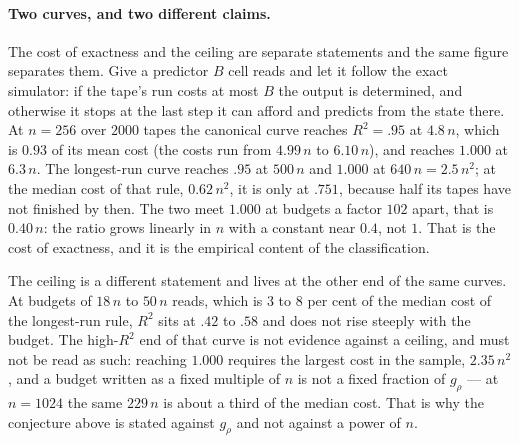 \documentclass[11pt]{article}
\begin{document}
\paragraph{Two curves, and two different claims.} The cost of exactness and the ceiling are separate
statements and the same figure separates them. Give a predictor $B$ cell reads and let it follow the
exact simulator: if the tape's run costs at most $B$ the output is determined, and otherwise it stops at
the last step it can afford and predicts from the state there. At $n=256$ over $2000$ tapes the
canonical curve reaches $R^2=.95$ at $4.8\,n$, which is $0.93$ of its mean cost (the costs run from
$4.99\,n$ to $6.10\,n$), and reaches $1.000$ at $6.3\,n$. The longest-run curve reaches $.95$ at
$500\,n$ and $1.000$ at $640\,n=2.5\,n^2$; at the median cost of that rule, $0.62\,n^2$, it is only at
$.751$, because half its tapes have not finished by then. The two meet $1.000$ at budgets a factor
$102$ apart, that is $0.40\,n$: the ratio grows linearly in $n$ with a constant near $0.4$, not $1$.
That is the cost of exactness, and it is the empirical content of the classification.

The ceiling is a different statement and lives at the other end of the same curves. At budgets of
$18\,n$ to $50\,n$ reads, which is $3$ to $8$ per cent of the median cost of the longest-run rule,
$R^2$ sits at $.42$ to $.58$ and does not rise steeply with the budget. The high-$R^2$ end of that
curve is not evidence against a ceiling, and must not be read as such: reaching $1.000$ requires the
largest cost in the sample, $2.35\,n^2$, and a budget written as a fixed multiple of $n$ is not a fixed
fraction of $g_\rho$ --- at $n=1024$ the same $229\,n$ is about a third of the median cost. That is why
the conjecture above is stated against $g_\rho$ and not against a power of $n$.
\end{document}

